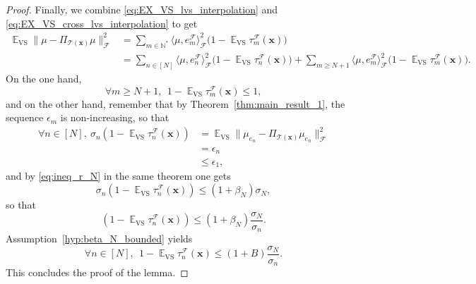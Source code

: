 \documentclass[twoside,11pt]{book}
\numberwithin{theorem}{chapter}
\numberwithin{definition}{chapter}
\numberwithin{proposition}{chapter}
\numberwithin{corollary}{chapter}
\numberwithin{example}{chapter}
\numberwithin{lemma}{chapter}
\DeclareMathOperator{\VS}{\mathrm{VS}}
\DeclareMathOperator{\EX}{\mathbb{E}}
\DeclareMathOperator{\F}{\mathcal{F}}
\begin{document}
\begin{proof}
Finally, we combine \eqref{eq:EX_VS_lvs_interpolation} and \eqref{eq:EX_VS_cross_lvs_interpolation} to get
\begin{align}
\EX_{\VS}\|\mu - \Pi_{\mathcal{T}(\bm{x})} \mu\|_{\F}^{2} & = \sum\limits_{m \in \mathbb{N}^{*}} \langle \mu, e_{m}^{\F} \rangle_{\F}^{2}\bigg(1- \EX_{\VS}\tau_{m}^{\F}(\bm{x})\bigg) \nonumber\\
& = \sum\limits_{n \in [N]} \langle \mu, e_{n}^{\F} \rangle_{\F}^{2}\bigg(1- \EX_{\VS}\tau_{n}^{\F}(\bm{x})\bigg) + \sum\limits_{m \geq N+1} \langle \mu, e_{m}^{\F} \rangle_{\F}^{2}\bigg(1- \EX_{\VS}\tau_{m}^{\F}(\bm{x})\bigg).
\end{align}
On the one hand,
\begin{equation}
\forall m \geq N+1, \:\: 1- \EX_{\VS}\tau_{m}^{\F}(\bm{x}) \leq 1,
\end{equation}
and on the other hand, remember that by Theorem~\ref{thm:main_result_1}, the sequence $\epsilon_{m}$ is non-increasing, so that
\begin{align}
\forall n \in [N], \: \sigma_{n} (1-\EX_{\VS} \tau_{n}^{\F}(\bm{x})) & = \EX_{\VS} \|\mu_{e_{n}} - \Pi_{\mathcal{T}(\bm{x})} \mu_{e_{n}}\|_{\F}^{2} \\
& = \epsilon_{n} \\
& \leq \epsilon_{1},
\end{align}
and by \eqref{eq:ineq_r_N} in the same theorem one gets
\begin{equation}
\sigma_{n} (1-\EX_{\VS} \tau_{n}^{\F}(\bm{x})) \leq (1+\beta_{N}) \sigma_{N},
\end{equation}
so that
\begin{equation}
 (1-\EX_{\VS} \tau_{n}^{\F}(\bm{x})) \leq (1+\beta_{N})\frac{ \sigma_{N}}{\sigma_{n}}.
\end{equation}
Assumption~\ref{hyp:beta_N_bounded} yields \
\begin{equation}
\forall n \in [N],\:\: 1- \EX_{\VS}\tau_{n}^{\F}(\bm{x}) \leq  (1+B) \frac{\sigma_{N}}{\sigma_{n}}.
\end{equation}
This concludes the proof of the lemma.
\end{proof}
\end{document}
